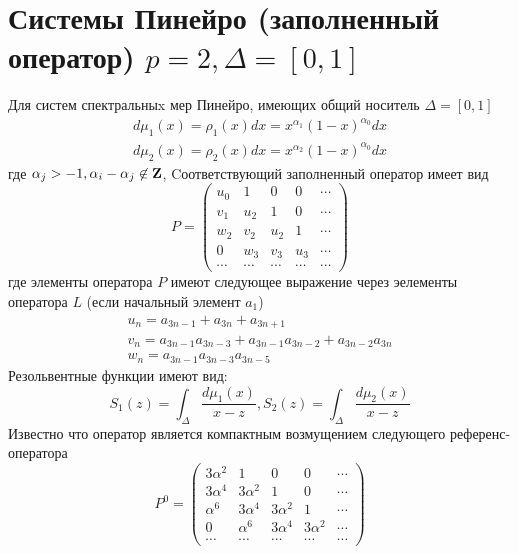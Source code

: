 \documentclass[12pt, a4paper]{report}
\begin{document}
\section{Системы Пинейро (заполненный оператор) $p=2, \Delta=[0,1]$}
Для систем спектральныx мер Пинейро, имеющих общий носитель $\Delta=[0,1]$
$$
\begin{array}{llll}
d\mu_1(x)=\rho_1(x) dx = x^{\alpha_1}(1-x)^{\alpha_0} dx \\
d\mu_2(x)=\rho_2(x) dx = x^{\alpha_2}(1-x)^{\alpha_0} dx
\end{array}
$$
где $\alpha_j>-1, \alpha_i-\alpha_j \not \in \bf Z\rm$, 
Cоответствующий заполненный оператор имеет вид
\begin{equation}
P = \left(\begin{array}{ccccccc}
u_0 & 1 & 0 & 0 & \cdots \\
v_1 & u_2 & 1 & 0 & \cdots \\
w_2 & v_2 & u_2 & 1 & \cdots \\
0 & w_3 & v_3 & u_3 & \cdots \\
\cdots & \cdots & \cdots & \cdots & \cdots 
\end{array}\right)
\end{equation}
где элементы оператора $P$ имеют следующее выражение через эелементы оператора $L$ (если начальный элемент $a_1$)
$$
\begin{array}{lllllllllllllll}
u_n = a_{3n-1}+a_{3n}+a_{3n+1} \\
v_n = a_{3n-1} a_{3n-3} + a_{3n-1}a_{3n-2} + a_{3n-2}a_{3n} \\
w_n = a_{3n-1} a_{3n-3} a_{3n-5}
\end{array}
$$
Резольвентные функции имеют вид:
$$
S_1(z)=\int_{\Delta} {\displaystyle \frac{d\mu_1(x)}{x-z}}, S_2(z)=\int_{\Delta} {\displaystyle \frac{d\mu_2(x)}{x-z}}
$$
Известно что оператор является компактным возмущением следующего референс-оператора
\begin{equation}
P^{0} = \left(\begin{array}{ccccccc}
3\alpha^2 & 1 & 0 & 0 & \cdots \\
3\alpha^4 & 3\alpha^2 & 1 & 0 & \cdots \\
\alpha^6 & 3\alpha^4 & 3\alpha^2 & 1 & \cdots \\
0 & \alpha^6 & 3\alpha^4 & 3\alpha^2 & \cdots \\
\cdots & \cdots & \cdots & \cdots & \cdots 
\end{array}\right)
\end{equation}
\end{document}
